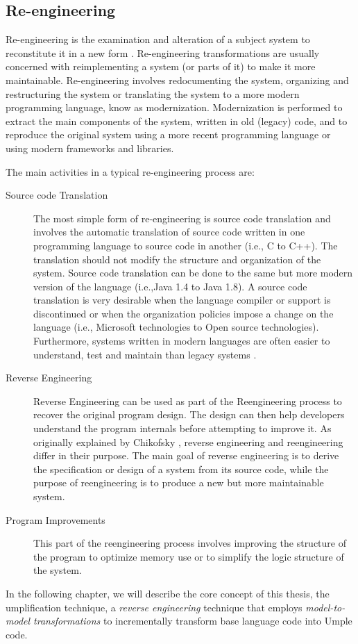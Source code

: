 \subsection{Re-engineering}

Re-engineering is the examination and alteration of a subject system to reconstitute it in a new form \cite{Chikofsky}. 
Re-engineering transformations are usually concerned with reimplementing a system (or parts of it) to make it more maintainable. Re-engineering involves redocumenting the system, organizing and restructuring the system or translating the system to a more modern programming language, know as modernization. Modernization is performed to extract the main components of the system, written in old (legacy) code, and to reproduce the original system using a more recent programming language or using modern frameworks and libraries.

The main activities in a typical re-engineering process are:

\begin{description}
\item[Source code Translation]
The most simple form of re-engineering is source code translation and involves the automatic translation of source code written in one programming language to source code in another (i.e., C to C++). The translation should not modify the structure and organization of the system. Source code translation can be done to the same but more modern version of the language (i.e.,Java 1.4 to Java 1.8). A source code translation is very desirable when the language compiler or support is discontinued or when the organization policies impose a change on the language (i.e., Microsoft technologies to Open source technologies). Furthermore, systems written in modern languages are often easier to understand, test and maintain than legacy systems \cite{Pressman2001}.

\item[Reverse Engineering]
Reverse Engineering can be used as part of the Reengineering process to recover the original program design. The design can then help developers understand the program internals before attempting to improve it. As originally explained by Chikofsky  \cite{Chikofsky}, reverse engineering and reengineering differ in their purpose. The main goal of reverse engineering is to derive the specification or design of a system from its source code, while the purpose of reengineering is to produce a new but more maintainable system. 

\item[Program Improvements]
This part of the reengineering process involves improving the structure of the program to optimize memory use or to simplify the logic structure of the system. 
\end{description}

In the following chapter, we will describe the core concept of this thesis, the umplification technique, a \textit{reverse engineering} technique that employs \textit{model-to-model transformations} to  incrementally transform base language code into Umple code.